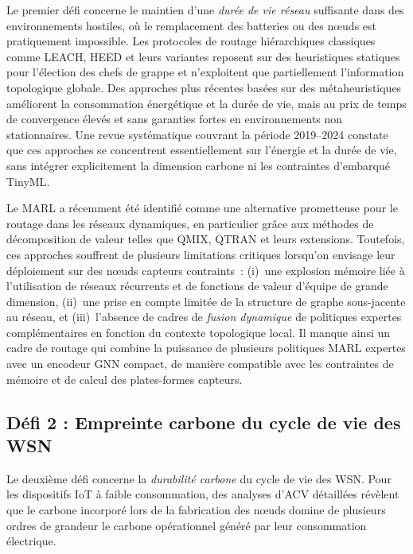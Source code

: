 Le premier défi concerne le maintien d'une \emph{durée de vie réseau} suffisante dans des environnements hostiles, où le remplacement des batteries ou des nœuds est pratiquement impossible. Les protocoles de routage hiérarchiques classiques comme LEACH, HEED et leurs variantes reposent sur des heuristiques statiques pour l'élection des chefs de grappe et n'exploitent que partiellement l'information topologique globale\cite{heinzelman2000leach,heinzelman2002leach,younis2004heed,kumar2012eeleach}. Des approches plus récentes basées sur des métaheuristiques améliorent la consommation énergétique et la durée de vie, mais au prix de temps de convergence élevés et sans garanties fortes en environnements non stationnaires\cite{karaboga2005abc,abualigah_swarm_2023,chaurasia_mocraw_2023,elkhediri2024abcaco,dinesh_hbo-sroa_2024}. Une revue systématique couvrant la période 2019--2024 constate que ces approches se concentrent essentiellement sur l'énergie et la durée de vie, sans intégrer explicitement la dimension carbone ni les contraintes d'embarqué TinyML\cite{metaheuristic_wsn_slr2026,tinyml_review_acm2024}.

Le MARL a récemment été identifié comme une alternative prometteuse pour le routage dans les réseaux dynamiques, en particulier grâce aux méthodes de décomposition de valeur telles que QMIX, QTRAN et leurs extensions\cite{rashid2018qmix,son2019qtran,liu2024gnncomm,ding_packet_2022}. Toutefois, ces approches souffrent de plusieurs limitations critiques lorsqu'on envisage leur déploiement sur des nœuds capteurs contraints~: (i)~une explosion mémoire liée à l'utilisation de réseaux récurrents et de fonctions de valeur d'équipe de grande dimension, (ii)~une prise en compte limitée de la structure de graphe sous-jacente au réseau, et (iii)~l'absence de cadres de \emph{fusion dynamique} de politiques expertes complémentaires en fonction du contexte topologique local\cite{liu2024gnncomm,guo2024rldas,Hayes2022MOMARL}. Il manque ainsi un cadre de routage qui combine la puissance de plusieurs politiques MARL expertes avec un encodeur GNN compact, de manière compatible avec les contraintes de mémoire et de calcul des plates-formes capteurs\cite{Nguyen2025GNNIoT,tinyml_review_acm2024}.

\subsection{Défi 2 : Empreinte carbone du cycle de vie des WSN}

Le deuxième défi concerne la \emph{durabilité carbone} du cycle de vie des WSN. Pour les dispositifs IoT à faible consommation, des analyses d'ACV détaillées révèlent que le carbone incorporé lors de la fabrication des nœuds domine de plusieurs ordres de grandeur le carbone opérationnel généré par leur consommation électrique\cite{pirson2021embodied,bashir2024sunk,aioti2024carbon}.

